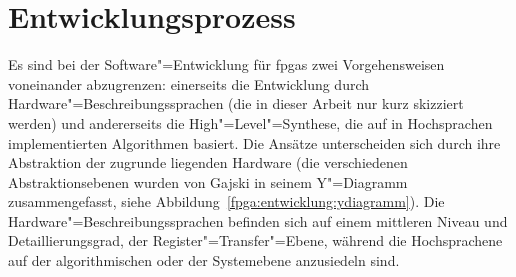 \section{Entwicklungsprozess}\label{fpga:entwicklung}

Es sind bei der Software"=Entwicklung für \gls{fpga}s zwei Vorgehensweisen
voneinander abzugrenzen: einerseits die Entwicklung durch
Hardware"=Beschreibungssprachen (die in dieser Arbeit nur kurz skizziert
werden) und andererseits die High"=Level"=Synthese, die auf in Hochsprachen
implementierten Algorithmen basiert. Die Ansätze unterscheiden sich durch ihre
Abstraktion der zugrunde liegenden Hardware (die verschiedenen
Abstraktionsebenen wurden von Gajski in seinem Y"=Diagramm zusammengefasst, siehe
Abbildung~\ref{fpga:entwicklung:ydiagramm}). Die Hardware"=Beschreibungssprachen
befinden sich auf einem mittleren Niveau und Detaillierungsgrad, der
Register"=Transfer"=Ebene, während die Hochsprachene auf der algorithmischen
oder der Systemebene anzusiedeln sind. \cite[vgl.][10--11]{kesel2013}

